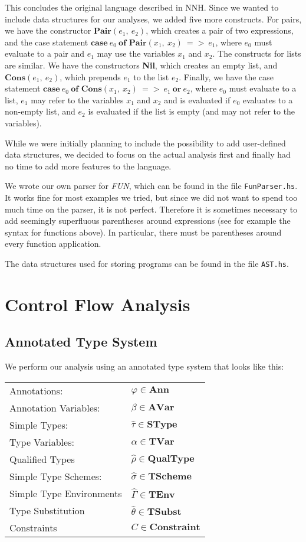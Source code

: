 \documentclass[a4paper,11pt]{article}
\begin{document}
This concludes the original language described in NNH. Since we wanted to include data structures for our analyses, we added five more constructs. For pairs, we have the constructor $\textbf{Pair}(e_1,\:e_2)$, which creates a pair of two expressions, and the case statement $\textbf{case}\:e_0\:\textbf{of Pair}(x_1,\:x_2)\:=>\:e_1$, where $e_0$ must evaluate to a pair and $e_1$ may use the variables $x_1$ and $x_2$. The constructs for lists are similar. We have the constructors \textbf{Nil}, which creates an empty list, and $\textbf{Cons}(e_1,\:e_2)$, which prepends $e_1$ to the list $e_2$. Finally, we have the case statement $\textbf{case}\:e_0\:\textbf{of Cons}(x_1,\:x_2)\:=>\:e_1\:\textbf{or}\:e_2$, where $e_0$ must evaluate to a list, $e_1$ may refer to the variables $x_1$ and $x_2$ and is evaluated if $e_0$ evaluates to a non-empty list, and $e_2$ is evaluated if the list is empty (and may not refer to the variables).

While we were initially planning to include the possibility to add user-defined data structures, we decided to focus on the actual analysis first and finally had no time to add more features to the language.

We wrote our own parser for \emph{FUN}, which can be found in the file \texttt{FunParser.hs}. It works fine for most examples we tried, but since we did not want to spend too much time on the parser, it is not perfect. Therefore it is sometimes necessary to add seemingly superfluous parentheses around expressions (see for example the syntax for functions above). In particular, there must be parentheses around every function application. 

The data structures used for storing programs can be found in the file \texttt{AST.hs}.

\section{Control Flow Analysis}


\subsection{Annotated Type System}
We perform our analysis using an annotated type system that looks like this:

\begin{tabular}{l l}
Annotations: & $\varphi \in \textbf{Ann}$ \\
Annotation Variables: &	$\beta  \in \textbf{AVar}$ \\
Simple Types: &		$\hat{\tau} \in \textbf{SType}$ \\
Type Variables: & $\alpha \in \textbf{TVar}$ \\
Qualified Types & $\hat{\rho} \in \textbf{QualType}$\\
Simple Type Schemes: &		$\hat{\sigma} \in \textbf{TScheme}$ \\
Simple Type Environments &		$\hat{\Gamma} \in \textbf{TEnv} $ \\
Type Substitution & $\hat{\theta} \in \textbf{TSubst}$\\
Constraints &	$C \in \textbf{Constraint}$ \\
\end{tabular}
\end{document}
